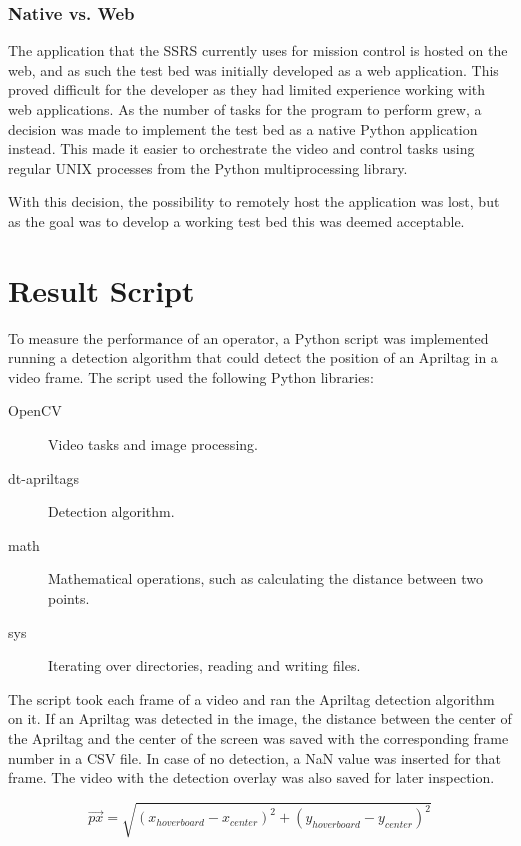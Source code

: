 \documentclass[nofilelist]{cslthse-msc}
\begin{document}
\subsubsection{Native vs. Web}
The application that the SSRS currently uses for mission control is hosted on the web, and as such the test bed was initially developed as a web application. This proved difficult for the developer as they had limited experience working with web applications. As the number of tasks for the program to perform grew, a decision was made to implement the test bed as a native Python application instead. This made it easier to orchestrate the video and control tasks using regular UNIX processes from the Python multiprocessing library. 

With this decision, the possibility to remotely host the application was lost, but as the goal was to develop a working test bed this was deemed acceptable. 

\section{Result Script}
\label{sec:resultscript}
To measure the performance of an operator, a Python script was implemented running a detection algorithm that could detect the position of an Apriltag in a video frame. The script used the following Python libraries:
\begin{description}
   \item[OpenCV] Video tasks and image processing.
   \item[dt-apriltags] Detection algorithm.
   \item[math] Mathematical operations, such as calculating the distance between two points.
   \item[sys] Iterating over directories, reading and writing files.  
\end{description}

The script took each frame of a video and ran the Apriltag detection algorithm on it. If an Apriltag was detected in the image, the distance between the center of the Apriltag and the center of the screen was saved with the corresponding frame number in a CSV file. In case of no detection, a NaN value was inserted for that frame. The video with the detection overlay was also saved for later inspection.

\begin{equation}
   \label{eq:distance}
   \overrightarrow{px} = \sqrt{(x_{hoverboard} - x_{center})^2 + (y_{hoverboard} - y_{center})^2}
\end{equation}
\end{document}
